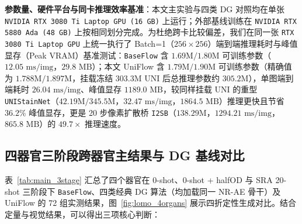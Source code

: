 \documentclass[journal]{IEEEtran}
\newcommand{\methodname}{UniFlow}
\begin{document}
\noindent\textbf{参数量、硬件平台与同卡推理效率基准}：本文主实验与四类 DG 对照均在单张 \texttt{NVIDIA RTX 3080 Ti Laptop GPU (16 GB)} 上运行；外部基线训练在 \texttt{NVIDIA RTX 5880 Ada (48 GB)} 上按相同划分完成。为杜绝跨卡比较偏差，我们在同一张 \texttt{RTX 3080 Ti Laptop GPU} 上统一执行了 Batch=1（$256\times 256$）端到端推理耗时与峰值显存（Peak VRAM）基准测试：\texttt{BaseFlow} 含 $1.69\text{M}/1.80\text{M}$ 可训练参数（$12.05\text{ ms/img}$，$29.8\text{ MB}$）；本文 \methodname{} 含 $1.79\text{M}/1.90\text{M}$ 可训练参数（精确值为 $1.788\text{M}/1.897\text{M}$，挂载冻结 $303.3\text{M}$ UNI 后总推理参数约 $305.2\text{M}$），单图端到端耗时 \textbf{$26.04\text{ ms/img}$}、峰值显存 \textbf{$1189.0\text{ MB}$}，较同样挂载 UNI 的重型 \texttt{UNIStainNet}（$42.19\text{M} / 345.5\text{M}$，$32.47\text{ ms/img}$，$1864.5\text{ MB}$）推理更快且节省 $36.2\%$ 峰值显存，更是 20 步像素扩散桥 \texttt{I2SB}（$138.29\text{M}$，$1294.21\text{ ms/img}$，$865.8\text{ MB}$）的 \textbf{$49.7\times$} 推理速度。

\subsection{四器官三阶段跨器官主结果与 DG 基线对比}\label{sec:main_res}
表~\ref{tab:main_3stage} 汇总了四个器官在 0-shot、0-shot + halfOD 与 SRA 20-shot 三阶段下 \texttt{BaseFlow}、四类经典 DG 算法（均加载同一 NR-AE 骨干）及 \methodname{} 的 72 组实测结果，图~\ref{fig:lomo_4organs} 展示四折定性生成对比。结合定量与视觉结果，可以得出三项核心判断：
\end{document}
